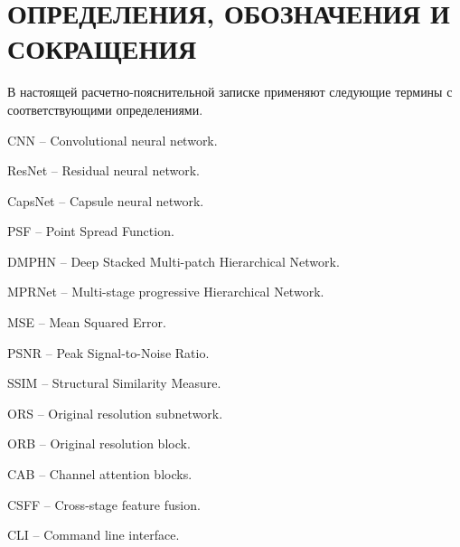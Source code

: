 \part*{ОПРЕДЕЛЕНИЯ, ОБОЗНАЧЕНИЯ И\\СОКРАЩЕНИЯ}
В настоящей расчетно-пояснительной записке применяют следующие термины с соответствующими определениями.

\begin{enumdescript}
	\item[CNN] -- Convolutional neural network.
	\item[ResNet] -- Residual neural network.
	\item[CapsNet] -- Capsule neural network.
	\item[PSF] -- Point Spread Function.
	\item[DMPHN] -- Deep Stacked Multi-patch Hierarchical Network.
	\item[MPRNet] -- Multi-stage progressive Hierarchical Network.
	\item[MSE] -- Mean Squared Error.
	\item[PSNR] -- Peak Signal-to-Noise Ratio.
	\item[SSIM] -- Structural Similarity Measure.
	\item[ORS] -- Original resolution subnetwork.
	\item[ORB] -- Original resolution block.
	\item[CAB] -- Channel attention blocks.
	\item[CSFF] -- Cross-stage feature fusion.
	\item[CLI] -- Command line interface.
\end{enumdescript}
